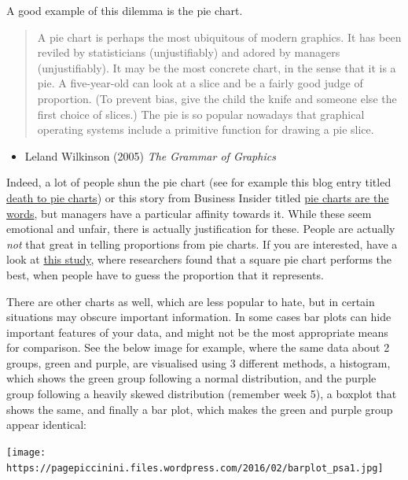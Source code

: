 \documentclass[]{book}
\providecommand{\tightlist}{%
  \setlength{\itemsep}{0pt}\setlength{\parskip}{0pt}}
\theoremstyle{definition}
\theoremstyle{definition}
\theoremstyle{definition}
\theoremstyle{remark}
\begin{document}
A good example of this dilemma is the pie chart.

\begin{quote}
A pie chart is perhaps the most ubiquitous of modern graphics. It has
been reviled by statisticians (unjustifiably) and adored by managers
(unjustifiably). It may be the most concrete chart, in the sense that it
is a pie. A five-year-old can look at a slice and be a fairly good judge
of proportion. (To prevent bias, give the child the knife and someone
else the first choice of slices.) The pie is so popular nowadays that
graphical operating systems include a primitive function for drawing a
pie slice.
\end{quote}

\begin{itemize}
\tightlist
\item
  Leland Wilkinson (2005) \emph{The Grammar of Graphics}
\end{itemize}

Indeed, a lot of people shun the pie chart (see for example this blog
entry titled
\href{http://www.storytellingwithdata.com/blog/2011/07/death-to-pie-charts}{death
to pie charts}) or this story from Business Insider titled
\href{http://www.businessinsider.com/pie-charts-are-the-worst-2013-6?IR=T}{pie
charts are the words}, but managers have a particular affinity towards
it. While these seem emotional and unfair, there is actually
justification for these. People are actually \emph{not} that great in
telling proportions from pie charts. If you are interested, have a look
at
\href{https://eagereyes.org/blog/2016/a-reanalysis-of-a-study-about-square-pie-charts-from-2009}{this
study}, where researchers found that a square pie chart performs the
best, when people have to guess the proportion that it represents.

There are other charts as well, which are less popular to hate, but in
certain situations may obscure important information. In some cases bar
plots can hide important features of your data, and might not be the
most appropriate means for comparison. See the below image for example,
where the same data about 2 groups, green and purple, are visualised
using 3 different methods, a histogram, which shows the green group
following a normal distribution, and the purple group following a
heavily skewed distribution (remember week 5), a boxplot that shows the
same, and finally a bar plot, which makes the green and purple group
appear identical:

\texttt{[image: https://pagepiccinini.files.wordpress.com/2016/02/barplot\_psa1.jpg]}
\end{document}
